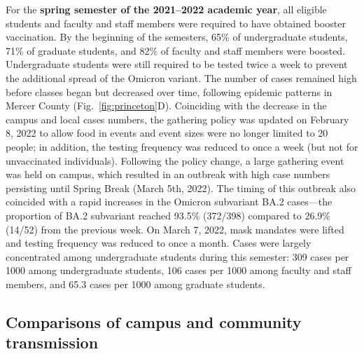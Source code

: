 \documentclass[12pt]{article}
\newcommand{\fref}[1]{Fig.~\ref{fig:#1}}
\begin{document}
For the \textbf{spring semester of the 2021--2022 academic year}, all eligible students and faculty and staff members were required to have obtained booster vaccination.
By the beginning of the semesters, 65\% of undergraduate students, 71\% of graduate students, and 82\% of faculty and staff members were boosted.
Undergraduate students were still required to be tested twice a week to prevent the additional spread of the Omicron variant.
The number of cases remained high before classes began but decreased over time, following epidemic patterns in Mercer County (\fref{princeton}D).
Coinciding with the decrease in the campus and local cases numbers, the gathering policy was updated on February 8, 2022 to allow food in events and event sizes were no longer limited to 20 people;
in addition, the testing frequency was reduced to once a week (but not for unvaccinated individuals).
Following the policy change, a large gathering event was held on campus, which resulted in an outbreak with high case numbers persisting until Spring Break (March 5th, 2022).
The timing of this outbreak also coincided with a rapid increases in the Omicron subvariant BA.2 cases---the proportion of BA.2 subvariant reached 93.5\% (372/398) compared to 26.9\% (14/52) from the previous week.
On March 7, 2022, mask mandates were lifted and testing frequency was reduced to once a month.
Cases were largely concentrated among undergraduate students during this semester: 309 cases per 1000 among undergraduate students, 106 cases per 1000 among faculty and staff members, and 65.3 cases per 1000 among graduate students.

\subsection*{Comparisons of campus and community transmission}
\end{document}
